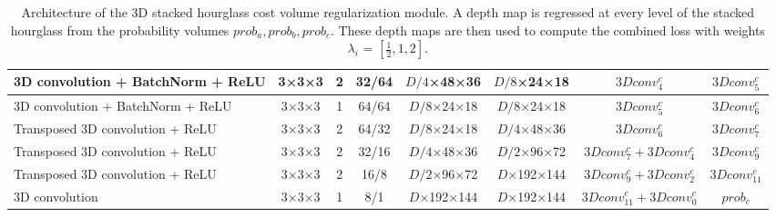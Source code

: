 \begin{table}[htbp]
\begin{adjustbox}{width=1\textwidth}
\begin{tabular}{|l|c|c|c|c|c|c|c|}
3D convolution + BatchNorm + ReLU                             & 3×3×3             & 2               & 32/64        & $D/4$×48×36            & $D/8$×24×18             & $3Dconv^c_4$            & $3Dconv^c_5$          \\ \hline
3D convolution + BatchNorm + ReLU                             & 3×3×3             & 1               & 64/64       & $D/8$×24×18             & $D/8$×24×18            & $3Dconv^c_5$             & $3Dconv^c_6$          \\ \hline
Transposed 3D convolution + ReLU                  & 3×3×3             & 2               & 64/32          & $D/8$×24×18            & $D/4$×48×36            & $3Dconv^c_6$             & $3Dconv^c_7$          \\ \hline
Transposed 3D convolution + ReLU                 & 3×3×3             & 2               & 32/16        & $D/4$×48×36            & $D/2$×96×72           & $3Dconv^c_7+3Dconv^c_4$             & $3Dconv^c_9$         \\ \hline
Transposed 3D convolution + ReLU                 & 3×3×3             & 2               & 16/8        & $D/2$×96×72           & $D$×192×144           & $3Dconv^c_9+3Dconv^c_2$ & $3Dconv^c_11$          \\ \hline
3D convolution                             & 3×3×3             & 1               & 8/1           & $D$×192×144           & $D$×192×144           & $3Dconv^c_11+3Dconv^c_0$             & $prob_c$           \\ \hline
\end{tabular}
\end{adjustbox}
\caption[Architecture of the 3D stacked hourglass cost volume regularization module.]{Architecture of the 3D stacked hourglass cost volume regularization module. A depth map is regressed at every level of the stacked hourglass from the probability volumes \(prob_a, prob_b, prob_c\). These depth maps are then used to compute the combined loss with weights \(\lambda_i\) = $[\frac{1}{2}, 1, 2]$.
}
\label{tab:arch-stacked}
\end{table}